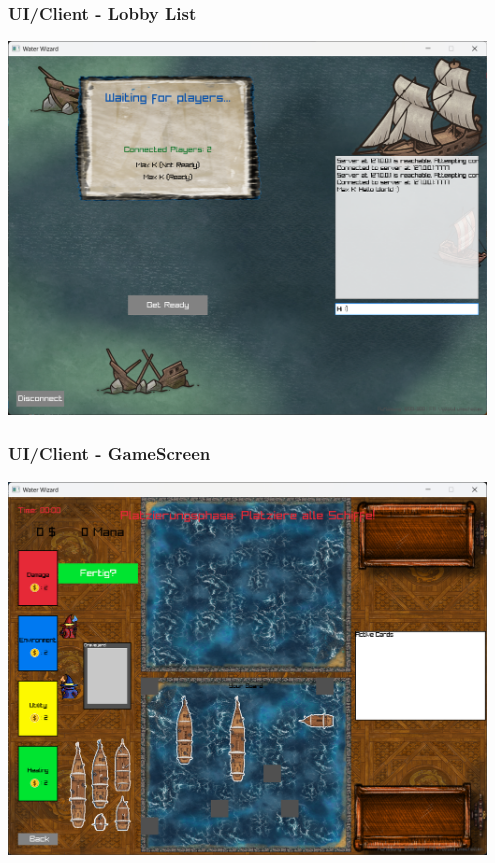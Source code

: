 \documentclass{beamer}
\begin{document}
\begin{frame}
  \frametitle{UI/Client - Lobby List}
  \includegraphics[width=0.95\textwidth]{LobbyScreen.png}
\end{frame}

\begin{frame}
  \frametitle{UI/Client - GameScreen}
  \includegraphics[width=0.95\textwidth]{GameScreen.png}
\end{frame}
\end{document}
